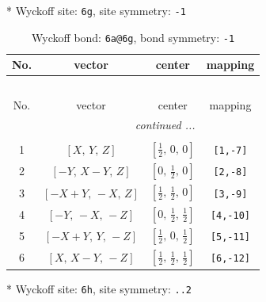 \documentclass[fleqn,8pt]{jsarticle}
\begin{document}
* Wyckoff site: {\tt 6g}, site symmetry: {\tt -1}
\renewcommand{\arraystretch}{1.2}
\begin{longtable}{cccc}
\caption{Wyckoff bond: {\tt 6a@6g}, bond symmetry: {\tt -1}}
 \\
 \hline \hline
No. & vector & center & mapping \\ \hline \endfirsthead

\multicolumn{3}{l}{\tablename\ \thetable{}} \\
 \hline \hline
No. & vector & center & mapping \\ \hline \endhead

 \hline \hline
\multicolumn{3}{r}{\footnotesize\it continued ...} \\ \endfoot

 \hline \hline
\multicolumn{3}{r}{} \\ \endlastfoot

1 & $\left[ X,\, Y,\, Z \right]$ & $\left[ \frac{1}{2},\, 0,\, 0 \right]$ & {\tt [1,-7]} \\ \hline
2 & $\left[ - Y,\, X - Y,\, Z \right]$ & $\left[ 0,\, \frac{1}{2},\, 0 \right]$ & {\tt [2,-8]} \\ \hline
3 & $\left[ - X + Y,\, - X,\, Z \right]$ & $\left[ \frac{1}{2},\, \frac{1}{2},\, 0 \right]$ & {\tt [3,-9]} \\ \hline
4 & $\left[ - Y,\, - X,\, - Z \right]$ & $\left[ 0,\, \frac{1}{2},\, \frac{1}{2} \right]$ & {\tt [4,-10]} \\ \hline
5 & $\left[ - X + Y,\, Y,\, - Z \right]$ & $\left[ \frac{1}{2},\, 0,\, \frac{1}{2} \right]$ & {\tt [5,-11]} \\ \hline
6 & $\left[ X,\, X - Y,\, - Z \right]$ & $\left[ \frac{1}{2},\, \frac{1}{2},\, \frac{1}{2} \right]$ & {\tt [6,-12]} \\
\end{longtable}
* Wyckoff site: {\tt 6h}, site symmetry: {\tt ..2}
\renewcommand{\arraystretch}{1.2}
\end{document}
